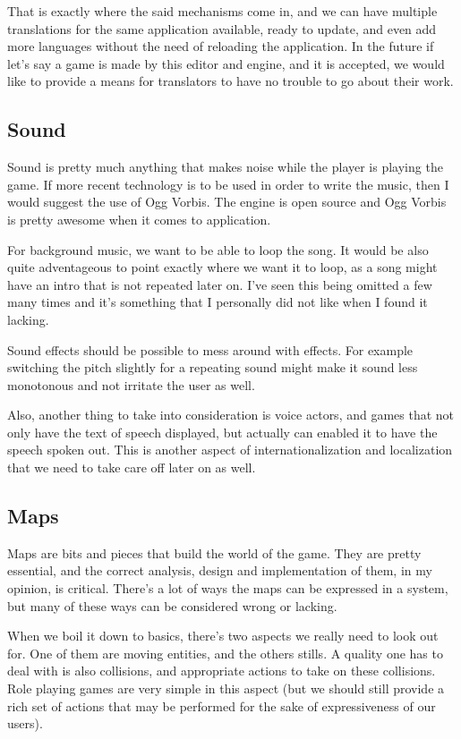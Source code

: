 That is exactly where the said mechanisms come in, and we can have multiple
translations for the same application available, ready to update, and even add
more languages without the need of reloading the application. In the future if
let's say a game is made by this editor and engine, and it is accepted, we
would like to provide a means for translators to have no trouble to go about
their work.

\subsection{Sound}

Sound is pretty much anything that makes noise while the player is playing the
game. If more recent technology is to be used in order to write the music, then
I would suggest the use of Ogg Vorbis. The engine is open source and Ogg Vorbis
is pretty awesome when it comes to application.

For background music, we want to be able to loop the song. It would be also
quite adventageous to point exactly where we want it to loop, as a song might
have an intro that is not repeated later on. I've seen this being omitted a few
many times and it's something that I personally did not like when I found it
lacking.

Sound effects should be possible to mess around with effects. For example
switching the pitch slightly for a repeating sound might make it sound less
monotonous and not irritate the user as well.

Also, another thing to take into consideration is voice actors, and games that
not only have the text of speech displayed, but actually can enabled it to have
the speech spoken out. This is another aspect of internationalization and
localization that we need to take care off later on as well.

\subsection{Maps}

Maps are bits and pieces that build the world of the game. They are pretty
essential, and the correct analysis, design and implementation of them, in my
opinion, is critical. There's a lot of ways the maps can be expressed in a
system, but many of these ways can be considered wrong or lacking.

When we boil it down to basics, there's two aspects we really need to look out
for. One of them are moving entities, and the others stills. A quality one has
to deal with is also collisions, and appropriate actions to take on these
collisions. Role playing games are very simple in this aspect (but we should
still provide a rich set of actions that may be performed for the sake of
expressiveness of our users).


